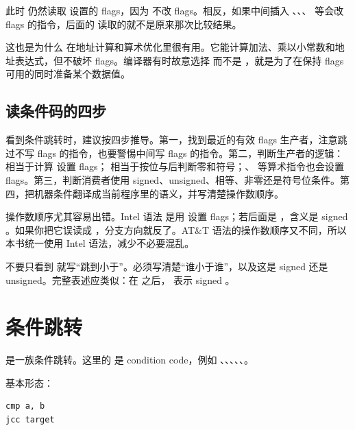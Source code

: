 此时  仍然读取  设置的 flags，因为  不改 flags。相反，如果中间插入 、、、 等会改 flags 的指令，后面的  读取的就不是原来那次比较结果。

这也是为什么  在地址计算和算术优化里很有用。它能计算加法、乘以小常数和地址表达式，但不破坏 flags。编译器有时故意选择  而不是 ，就是为了在保持 flags 可用的同时准备某个数据值。

\subsection{读条件码的四步}

看到条件跳转时，建议按四步推导。第一，找到最近的有效 flags 生产者，注意跳过不写 flags 的指令，也要警惕中间写 flags 的指令。第二，判断生产者的逻辑： 相当于计算  设置 flags； 相当于按位与后判断零和符号；、 等算术指令也会设置 flags。第三，判断消费者使用 signed、unsigned、相等、非零还是符号位条件。第四，把机器条件翻译成当前程序里的语义，并写清楚操作数顺序。

操作数顺序尤其容易出错。Intel 语法  是用  设置 flags；若后面是 ，含义是 signed 。如果你把它误读成 ，分支方向就反了。AT\&T 语法的操作数顺序又不同，所以本书统一使用 Intel 语法，减少不必要混乱。

\begin{warningbox}
不要只看到  就写“跳到小于”。必须写清楚“谁小于谁”，以及这是 signed 还是 unsigned。完整表述应类似：在  之后， 表示 signed 。
\end{warningbox}

\section{条件跳转}

 是一族条件跳转。这里的  是 condition code，例如 、、、、、。

基本形态：

\begin{lstlisting}
cmp a, b
jcc target
\end{lstlisting}


